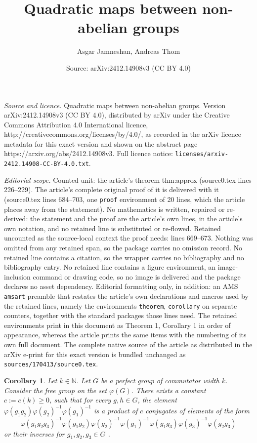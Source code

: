 \documentclass[10pt,a4paper]{amsart}
\title{Quadratic maps between non-abelian groups}
\author{Asgar Jamneshan, Andreas Thom}
\date{Source: arXiv:2412.14908v3 (CC BY 4.0)}
\newtheorem{corollary}{Corollary}
\begin{document}
\maketitle

\noindent\emph{Source and licence.} Quadratic maps between non-abelian groups. Version arXiv:2412.14908v3 (CC BY 4.0), distributed by arXiv under the Creative Commons Attribution 4.0 International licence, http://creativecommons.org/licenses/by/4.0/, as recorded in the arXiv licence metadata for this exact version and shown on the abstract page https://arxiv.org/abs/2412.14908v3. Full licence notice: \texttt{licenses/arxiv-2412.14908-CC-BY-4.0.txt}.\par\smallskip

\noindent\textit{Editorial scope.} Counted unit: the article's theorem thm:approx (source0.tex lines 226--229). The article's complete original proof of it is delivered with it (source0.tex lines 684--703, one \texttt{proof} environment of 20 lines, which the article places away from the statement). No mathematics is written, repaired or re-derived: the statement and the proof are the article's own lines, in the article's own notation, and no retained line is substituted or re-flowed.  Retained uncounted as the source-local context the proof needs: lines 669--673.  Nothing was omitted from any retained span, so the package carries no omission record.  No retained line contains a citation, so the wrapper carries no bibliography and no bibliography entry.  No retained line contains a figure environment, an image-inclusion command or drawing code, so no image is delivered and the package declares no asset dependency.  Editorial formatting only, in addition: an AMS \texttt{amsart} preamble that restates the article's own declarations and macros used by the retained lines, namely the environments \texttt{theorem}, \texttt{corollary} on separate counters, together with the standard packages those lines need.  The retained environments print in this document as Theorem 1, Corollary 1 in order of appearance, whereas the article prints the same items with the numbering of its own full document.  The complete native source of the article as distributed in the arXiv e-print for this exact version is bundled unchanged as \texttt{sources/170413/source0.tex}.
\begin{corollary} \label{cor:bound} Let $k \in \mathbb N.$
Let $G$ be a perfect group of commutator width $k$. Consider the free group on the set $\varphi(G)$. There exists a constant $c:=c(k)\geq 0$, such that for every $g,h \in G$, the element $\varphi(g_1g_2)\varphi(g_2)^{-1} \varphi(g_1)^{-1}$ is a product of $c$ conjugates of elements of the form
$$\varphi(g_1g_2g_3)^{-1} \varphi(g_1g_2)\varphi(g_2)^{-1}\varphi(g_1)^{-1} \varphi(g_1g_3)\varphi(g_3)^{-1}\varphi(g_2g_3)$$
or their inverses for $g_1,g_2,g_3 \in G$ .
\end{corollary}
\end{document}
